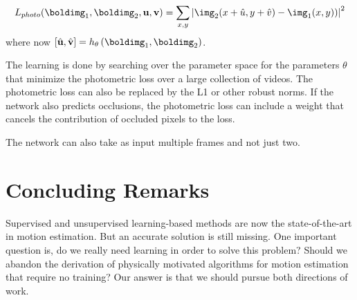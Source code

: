 \begin{equation}
    L_{photo}(\boldimg_1,\boldimg_2,\mathbf{u}, \mathbf{v})=
    \sum_{x,y} \left| \img_2 (x+\hat{u},y+\hat{v}) - \img_1 (x,y)) \right| ^2
\end{equation}
where now $\left[ \hat{\mathbf{u}}, \hat{\mathbf{v}} \right] =  h_\theta \left( \boldimg_1, \boldimg_2 \right)$.

The learning is done by searching over the parameter space for the parameters $\theta$ that minimize the photometric loss over a large collection of videos. The photometric loss can also be replaced by the L1 or other robust norms. If the network also predicts occlusions, the photometric loss can include a weight that cancels the contribution of occluded pixels to the loss.

The network can also take as input multiple frames and not just two.



\section{Concluding Remarks}

Supervised and unsupervised learning-based methods are now the state-of-the-art in motion estimation. But an accurate solution is still missing. One important question is, do we really need learning in order to solve this problem? Should we abandon the derivation of physically motivated algorithms for motion estimation that require no training? Our answer is that we should pursue both directions of work.
